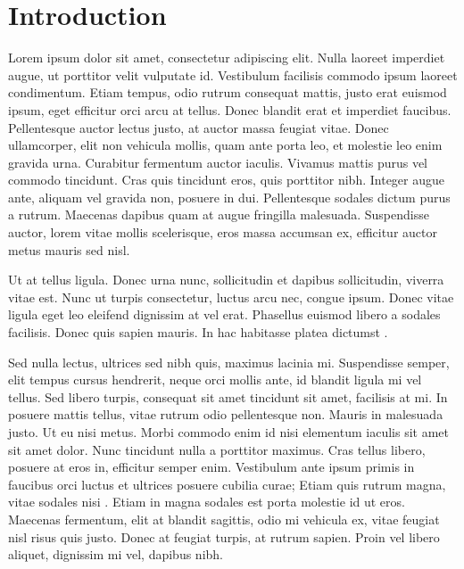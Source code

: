 \section{Introduction}

\citet{Salvagno2023} Lorem ipsum dolor sit amet, consectetur adipiscing elit. Nulla laoreet imperdiet augue, ut porttitor velit vulputate id. Vestibulum facilisis commodo ipsum laoreet condimentum. Etiam tempus, odio rutrum consequat mattis, justo erat euismod ipsum, eget efficitur orci arcu at tellus. Donec blandit erat et imperdiet faucibus. Pellentesque auctor lectus justo, at auctor massa feugiat vitae. Donec ullamcorper, elit non vehicula mollis, quam ante porta leo, et molestie leo enim gravida urna. Curabitur fermentum auctor iaculis. Vivamus mattis purus vel commodo tincidunt. Cras quis tincidunt eros, quis porttitor nibh. Integer augue ante, aliquam vel gravida non, posuere in dui. Pellentesque sodales dictum purus a rutrum. Maecenas dapibus quam at augue fringilla malesuada. Suspendisse auctor, lorem vitae mollis scelerisque, eros massa accumsan ex, efficitur auctor metus mauris sed nisl.

Ut at tellus ligula. Donec urna nunc, sollicitudin et dapibus sollicitudin, viverra vitae est. Nunc ut turpis consectetur, luctus arcu nec, congue ipsum. Donec vitae ligula eget leo eleifend dignissim at vel erat. Phasellus euismod libero a sodales facilisis. Donec quis sapien mauris. In hac habitasse platea dictumst \citep{Zhang2021}.

Sed nulla lectus, ultrices sed nibh quis, maximus lacinia mi. Suspendisse semper, elit tempus cursus hendrerit, neque orci mollis ante, id blandit ligula mi vel tellus. Sed libero turpis, consequat sit amet tincidunt sit amet, facilisis at mi. In posuere mattis tellus, vitae rutrum odio pellentesque non. Mauris in malesuada justo. \citet{Holzinger2023} Ut eu nisi metus. Morbi commodo enim id nisi elementum iaculis sit amet sit amet dolor. Nunc tincidunt nulla a porttitor maximus. Cras tellus libero, posuere at eros in, efficitur semper enim. Vestibulum ante ipsum primis in faucibus orci luctus et ultrices posuere cubilia curae; Etiam quis rutrum magna, vitae sodales nisi  \citep{Chen2020}. Etiam in magna sodales est porta molestie id ut eros. Maecenas fermentum, elit at blandit sagittis, odio mi vehicula ex, vitae feugiat nisl risus quis justo. Donec at feugiat turpis, at rutrum sapien. Proin vel libero aliquet, dignissim mi vel, dapibus nibh.
